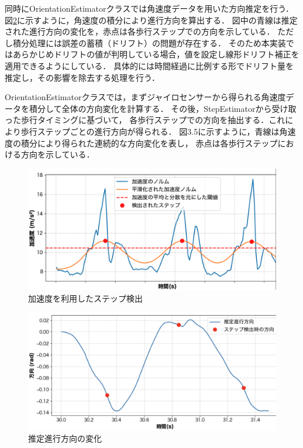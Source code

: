 同時にOrientationEstimatorクラスでは角速度データを用いた方向推定を行う．
図\ref{fig:step_timing}に示すように，角速度の積分により進行方向を算出する．
図中の青線は推定された進行方向の変化を，赤点は各歩行ステップでの方向を示している．
ただし積分処理には誤差の蓄積（ドリフト）の問題が存在する．
そのため本実装ではあらかじめドリフトの値が判明している場合，値を設定し線形ドリフト補正を適用できるようにしている．%
具体的には時間経過に比例する形でドリフト量を推定し，その影響を除去する処理を行う．

OrientationEstimatorクラスでは，まずジャイロセンサーから得られる角速度データを積分して全体の方向変化を計算する．
その後，StepEstimatorから受け取った歩行タイミングに基づいて，
各歩行ステップでの方向を抽出する．これにより歩行ステップごとの進行方向が得られる．
図3.5に示すように，青線は角速度の積分により得られた連続的な方向変化を表し，
赤点は各歩行ステップにおける方向を示している．

\begin{figure}[H]
	\centering
	\includegraphics[width=\linewidth]{../image/step_detect.jpg}
	\caption{加速度を利用したステップ検出}    \label{fig:step_detect}
\end{figure}

\begin{figure}[H]
	\centering
	\includegraphics[width=\linewidth]{../image/step_timing_angle.jpg}
	\caption{推定進行方向の変化}    \label{fig:step_timing}
\end{figure}


